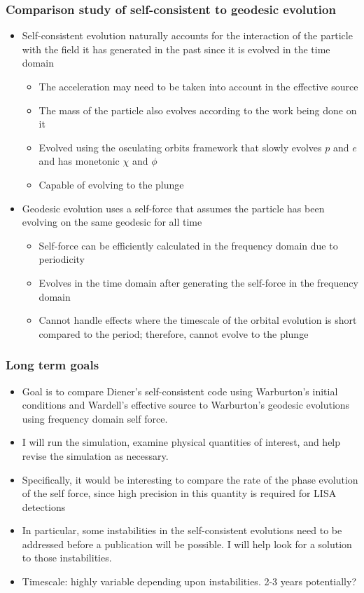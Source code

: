 \documentclass{beamer}
\begin{document}
      
\begin{frame}
  \frametitle{Comparison study of self-consistent to geodesic evolution}
  \begin{itemize}
  \item Self-consistent evolution naturally accounts for the interaction of the particle with the field it has generated in the past since it is evolved in the time domain
    \begin{itemize}
    \item The acceleration may need to be taken into account in the effective source
    \item The mass of the particle also evolves according to the work being done on it
    \item Evolved using the osculating orbits framework that slowly evolves $p$ and $e$ and has monetonic $\chi$ and $\phi$
    \item Capable of evolving to the plunge
    \end{itemize}
  \item Geodesic evolution uses a self-force that assumes the particle has been evolving on the same geodesic for all time
    \begin{itemize}
    \item Self-force can be efficiently calculated in the frequency domain due to periodicity
    \item Evolves in the time domain after generating the self-force in the frequency domain
    \item Cannot handle effects where the timescale of the orbital evolution is short compared to the period; therefore, cannot evolve to the plunge
    \end{itemize}
  \end{itemize}
\end{frame}

\begin{frame}
  \frametitle{Long term goals}
  \begin{itemize}
  \item Goal is to compare Diener's self-consistent code using Warburton's initial conditions and Wardell's effective source to Warburton's geodesic evolutions using frequency domain self force.
  \item I will run the simulation, examine physical quantities of interest, and help revise the simulation as necessary.
\item Specifically, it would be interesting to compare the rate of the phase evolution of the self force, since high precision in this quantity is required for LISA detections
  \item In particular, some instabilities in the self-consistent evolutions need to be addressed before a publication will be possible. I will help look for a solution to those instabilities. 
  \item Timescale: highly variable depending upon instabilities. 2-3 years potentially?
  \end{itemize}
\end{frame}
\end{document}
